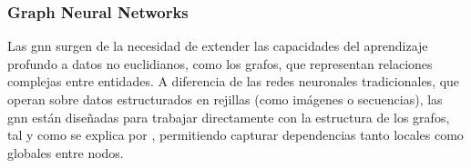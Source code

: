 \begin{comment}
La metodología aplicada consistía en los siguientes pasos. Para empezar, se aplica la transformada de wavelet para descomponer los datos de tráfico en componentes de diferentes frecuencias. Posteriormente, usa una 2DCNN para aprender las representaciones espaciales y temporales de los datos descompuestos y, para finalizar, se fusionan las características aprendidas para realizar la predicción del flujo del tráfico.

En consecuencia, el modelo WT-2DCNN demostró una mejora significativa en la precisión de la predicción del flujo de tráfico en comparación con métodos tradicionales, especialmente en escenarios con datos ruidosos.

En otro artículo científico titulado \textit{MF-CNN: Traffic Flow Prediction Using Convolutional Neural Network and Multi-Features Fusion}, los autores \cite{forecastMfCnn} presentan un modelo que integra múltiples características espaciales y temporales, así como factores externos como el clima y los días festivos, utilizando una red CNN para la predicción del flujo de tráfico.​

La metodología aplicada comienza por la extracción de características temporales a corto y largo plazo del flujo de tráfico. Seguidamente, se representan las características en matrices bidimensionales combinando dimensiones espaciales y temporales. A continuación, se aplica una \acrshort{cnn} para aprender las representaciones de las matrices y se finaliza fusionando las características aprendidas con factores externos mediante una capa de regresión logística para efectuar la predicción final.

Como resultado, el modelo MF-CNN logró una mejora notable en la precisión de la predicción del flujo de tráfico en comparación con varios modelos de referencia, demostrando la efectividad de integrar múltiples características y factores externos en el proceso de predicción.​
\end{comment}

\subsubsection{Graph Neural Networks}

Las \acrlong{gnn} surgen de la necesidad de extender las capacidades del aprendizaje profundo a datos no euclidianos, como los grafos, que representan relaciones complejas entre entidades. A diferencia de las redes neuronales tradicionales, que operan sobre datos estructurados en rejillas (como imágenes o secuencias), las \acrshort{gnn} están diseñadas para trabajar directamente con la estructura de los grafos, tal y como se explica por \cite{theoryGnn}, permitiendo capturar dependencias tanto locales como globales entre nodos.

